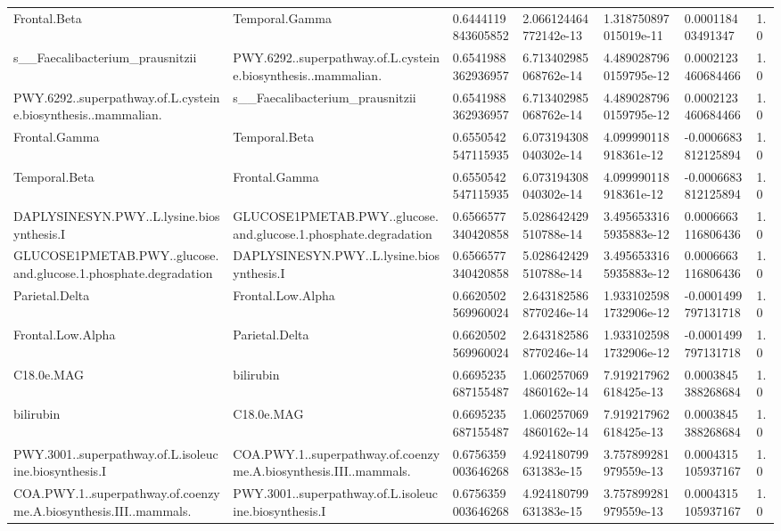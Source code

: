 \begin{longtable}{lllllll}
Frontal.Beta & Temporal.Gamma & 0.6444119843605852 & 2.066124464772142e-13 & 1.318750897015019e-11 & 0.000118403491347 & 1.0 \\
s\_\_Faecalibacterium\_prausnitzii & PWY.6292..superpathway.of.L.cysteine.biosynthesis..mammalian. & 0.6541988362936957 & 6.713402985068762e-14 & 4.4890287960159795e-12 & 0.0002123460684466 & 1.0 \\
PWY.6292..superpathway.of.L.cysteine.biosynthesis..mammalian. & s\_\_Faecalibacterium\_prausnitzii & 0.6541988362936957 & 6.713402985068762e-14 & 4.4890287960159795e-12 & 0.0002123460684466 & 1.0 \\
Frontal.Gamma & Temporal.Beta & 0.6550542547115935 & 6.073194308040302e-14 & 4.099990118918361e-12 & -0.0006683812125894 & 1.0 \\
Temporal.Beta & Frontal.Gamma & 0.6550542547115935 & 6.073194308040302e-14 & 4.099990118918361e-12 & -0.0006683812125894 & 1.0 \\
DAPLYSINESYN.PWY..L.lysine.biosynthesis.I & GLUCOSE1PMETAB.PWY..glucose.and.glucose.1.phosphate.degradation & 0.6566577340420858 & 5.028642429510788e-14 & 3.4956533165935883e-12 & 0.0006663116806436 & 1.0 \\
GLUCOSE1PMETAB.PWY..glucose.and.glucose.1.phosphate.degradation & DAPLYSINESYN.PWY..L.lysine.biosynthesis.I & 0.6566577340420858 & 5.028642429510788e-14 & 3.4956533165935883e-12 & 0.0006663116806436 & 1.0 \\
Parietal.Delta & Frontal.Low.Alpha & 0.6620502569960024 & 2.6431825868770246e-14 & 1.9331025981732906e-12 & -0.0001499797131718 & 1.0 \\
Frontal.Low.Alpha & Parietal.Delta & 0.6620502569960024 & 2.6431825868770246e-14 & 1.9331025981732906e-12 & -0.0001499797131718 & 1.0 \\
C18.0e.MAG & bilirubin & 0.6695235687155487 & 1.0602570694860162e-14 & 7.919217962618425e-13 & 0.0003845388268684 & 1.0 \\
bilirubin & C18.0e.MAG & 0.6695235687155487 & 1.0602570694860162e-14 & 7.919217962618425e-13 & 0.0003845388268684 & 1.0 \\
PWY.3001..superpathway.of.L.isoleucine.biosynthesis.I & COA.PWY.1..superpathway.of.coenzyme.A.biosynthesis.III..mammals. & 0.6756359003646268 & 4.924180799631383e-15 & 3.757899281979559e-13 & 0.0004315105937167 & 1.0 \\
COA.PWY.1..superpathway.of.coenzyme.A.biosynthesis.III..mammals. & PWY.3001..superpathway.of.L.isoleucine.biosynthesis.I & 0.6756359003646268 & 4.924180799631383e-15 & 3.757899281979559e-13 & 0.0004315105937167 & 1.0 \\

\end{longtable}
